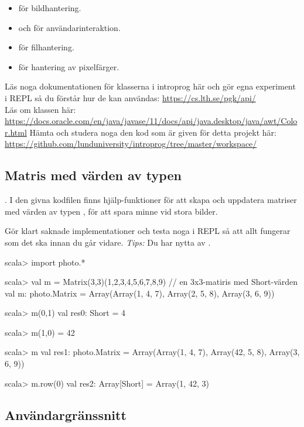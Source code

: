 \begin{itemize}
\item {} för bildhantering.
\item {} och  för användarinteraktion.
\item {} för filhantering.
\item {} för hantering av pixelfärger.
\end{itemize}
Läs noga dokumentationen för klasserna i introprog här och gör egna experiment i REPL så du förstår hur de kan användas: 
\url{https://cs.lth.se/pgk/api/}\\
Läs om klassen  här:\\\url{https://docs.oracle.com/en/java/javase/11/docs/api/java.desktop/java/awt/Color.html}
Hämta och studera noga den kod som är given för detta projekt här:\\
\url{https://github.com/lunduniversity/introprog/tree/master/workspace/}

\subsection{Matris med värden av typen }

\Task \textbf{}.
I den givna kodfilen  finns hjälp-funktioner för att skapa och uppdatera matriser med värden av typen , för att spara minne vid stora bilder.  

Gör klart saknade implementationer och testa noga i REPL så att allt fungerar som det ska innan du går vidare. \emph{Tips:} Du har nytta av . 
\begin{REPLsmall}
scala> import photo.*

scala> val m = Matrix(3,3)(1,2,3,4,5,6,7,8,9) // en 3x3-matiris med Short-värden
val m: photo.Matrix = Array(Array(1, 4, 7), Array(2, 5, 8), Array(3, 6, 9))

scala> m(0,1)
val res0: Short = 4

scala> m(1,0) = 42

scala> m
val res1: photo.Matrix = Array(Array(1, 4, 7), Array(42, 5, 8), Array(3, 6, 9))

scala> m.row(0)
val res2: Array[Short] = Array(1, 42, 3)
\end{REPLsmall}

\subsection{Användargränssnitt}

